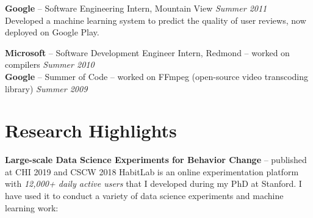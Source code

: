 \documentclass[margin,line]{resume}
\begin{document}
\begin{resume}
\vspace{-6.5mm}

\textbf{Google} -- Software Engineering Intern, Mountain View \hfill \textsl{Summer 2011}\\
Developed a machine learning system to predict the quality of user reviews, now deployed on Google Play.\\

\vspace{-6.5mm}

\textbf{Microsoft} -- Software Development Engineer Intern, Redmond -- worked on compilers \hfill \textsl{Summer 2010}\\
\textbf{Google} -- Summer of Code -- worked on FFmpeg (open-source video transcoding library) \hfill \textsl{Summer 2009}\\



\vspace{-4mm}

\section{\mysidestyle Research Highlights}

\textbf{Large-scale Data Science Experiments for Behavior Change} -- published at CHI 2019 and CSCW 2018
HabitLab is an online experimentation platform with \emph{12,000+ daily active users} that I developed during my PhD at Stanford. I have used it to conduct a variety of data science experiments and machine learning work:


\end{resume}
\end{document}

